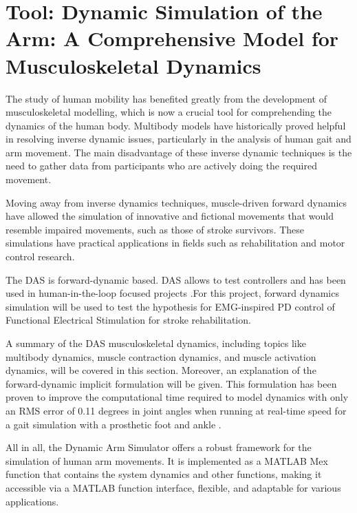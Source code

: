 \section{Tool: Dynamic Simulation of the Arm: A Comprehensive Model for Musculoskeletal Dynamics}
The study of human mobility has benefited greatly from the development of musculoskeletal modelling, which is now a crucial tool for comprehending the dynamics of the human body. Multibody models have historically proved helpful in resolving inverse dynamic issues, particularly in the analysis of human gait and arm movement. The main disadvantage of these inverse dynamic techniques is the need to gather data from participants who are actively doing the required movement.

Moving away from inverse dynamics techniques, muscle-driven forward dynamics have allowed the simulation of innovative and fictional movements that would resemble impaired movements, such as those of stroke survivors. These simulations have practical applications in fields such as rehabilitation and motor control research. 

The \ac{DAS} is forward-dynamic based. \ac{DAS} allows to test controllers and has been used in human-in-the-loop focused projects \cite{IMP}.For this project, forward dynamics simulation will be used to test the hypothesis for EMG-inspired PD control of Functional Electrical Stimulation for stroke rehabilitation. 

A summary of the \ac{DAS} musculoskeletal dynamics, including topics like multibody dynamics, muscle contraction dynamics, and muscle activation dynamics, will be covered in this section. Moreover, an explanation of the forward-dynamic implicit formulation will be given. This formulation has been proven to improve the computational time required to model dynamics with only an RMS error of 0.11 degrees in joint angles when running at real-time speed for a gait simulation with a prosthetic foot and ankle \cite{IMP}.

All in all, the Dynamic Arm Simulator offers a robust framework for the simulation of human arm movements. It is implemented as a MATLAB Mex function that contains the system dynamics and other functions, making it accessible via a MATLAB function interface, flexible, and adaptable for various applications. 


